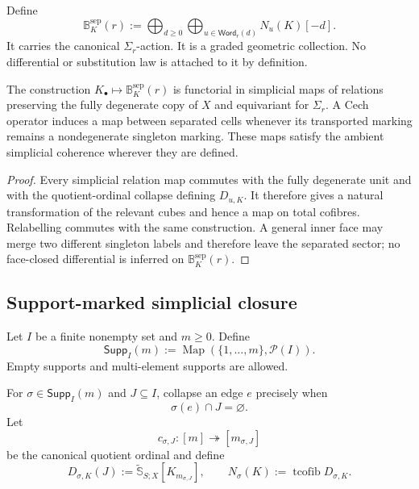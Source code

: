 \begin{definition}
\label{def:as-marked-bar-arity}
Define
\[
\boxed{
    \mathbb B_K^{\mathrm{sep}}(r)
    :=
    \bigoplus_{d\geq0}
    \bigoplus_{u\in\mathsf{Word}_r(d)}N_u(K)[-d].}
\]
It carries the canonical $\Sigma_r$-action.  It is a graded geometric
collection.  No differential or substitution law is attached to it by
definition.
\end{definition}

\begin{proposition}
\label{prop:as-marked-bar-substitution}
The construction $K_\bullet\mapsto\mathbb B_K^{\mathrm{sep}}(r)$ is functorial
in simplicial maps of relations preserving the fully degenerate copy of $X$
and equivariant for $\Sigma_r$.  A Cech operator induces a map between
separated cells whenever its transported marking remains a nondegenerate
singleton marking.  These maps satisfy the ambient simplicial coherence
wherever they are defined.
\end{proposition}

\begin{proof}
Every simplicial relation map commutes with the fully degenerate unit and with
the quotient-ordinal collapse defining $D_{u,K}$.  It therefore gives a
natural transformation of the relevant cubes and hence a map on total
cofibres.  Relabelling commutes with the same construction.  A general inner
face may merge two different singleton labels and therefore leave the
separated sector; no face-closed differential is inferred on
$\mathbb B_K^{\mathrm{sep}}(r)$.
\end{proof}

\subsection{Support-marked simplicial closure}

\begin{definition}
\label{def:as-support-markings}
Let $I$ be a finite nonempty set and $m\geq0$.  Define
\[
    \mathsf{Supp}_I(m)
    :=
    \operatorname{Map}
    \left(\{1,\ldots,m\},\mathcal P(I)\right).
\]
Empty supports and multi-element supports are allowed.
\end{definition}

\begin{construction}
\label{con:as-support-collapse-cube}
For $\sigma\in\mathsf{Supp}_I(m)$ and $J\subseteq I$, collapse an edge $e$
precisely when
\[
    \sigma(e)\cap J=\varnothing.
\]
Let
\[
    c_{\sigma,J}:[m]\twoheadrightarrow[m_{\sigma,J}]
\]
be the canonical quotient ordinal and define
\[
    D_{\sigma,K}(J)
    :=
    \widetilde{\mathbb S}_{S;X}[K_{m_{\sigma,J}}],
    \qquad
    N_\sigma(K):=\operatorname{tcofib}D_{\sigma,K}.
\]
\end{construction}


